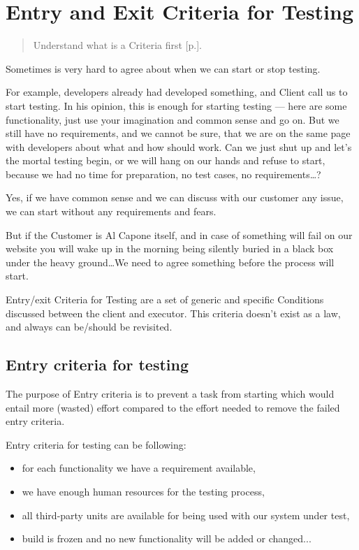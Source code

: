 \section{Entry and Exit Criteria for Testing}
\label{sec:Entry and Exit Criteria for Testing}

\begin{quote}
Understand what is a Criteria first [p.\pageref{sec:Criteria}].
\end{quote} 

Sometimes is very hard to agree about when we can start or stop testing.

For example, developers already had developed something, and Client call us to start testing. In his opinion, this is enough for starting testing — here are some functionality, just use your imagination and common sense and go on. But we still have no requirements, and we cannot be sure, that we are on the same page with developers about what and how should work. Can we just shut up and let's the mortal testing begin, or we will hang on our hands and refuse to start, because we had no time for preparation, no test cases, no requirements\ldots?

Yes, if we have common sense and we can discuss with our customer any issue, we can start without any requirements and fears.

But if the Customer is Al Capone itself, and in case of something will fail on our website you will wake up in the morning being silently buried in a black box under the heavy ground\ldots We need to agree something before the process will start.

Entry/exit Criteria for Testing are a set of generic and specific Conditions discussed between the client and executor. This criteria doesn't exist as a law, and always can be/should be revisited.

\subsection{Entry criteria for testing}
\label{sec:Entry criteria for testing}

The purpose of Entry criteria is to prevent a task from starting which would entail more (wasted) effort compared to the effort needed to remove the failed entry criteria.

Entry criteria for testing can be following:

    \begin{itemize}
\item 
for each functionality we have a requirement available,
\item 
    we have enough human resources for the testing process,
\item 
    all third-party units are available for being used with our system under test,
\item 
    build is frozen and no new functionality will be added or changed...                                                                        \end{itemize}


